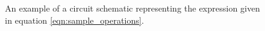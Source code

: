 \begin{figure}
    \begin{center}
    \caption{An example of a circuit schematic representing the expression given in equation \ref{eqn:sample_operations}.}
    \label{fig:sample_circuit}
    \end{center}
\end{figure}